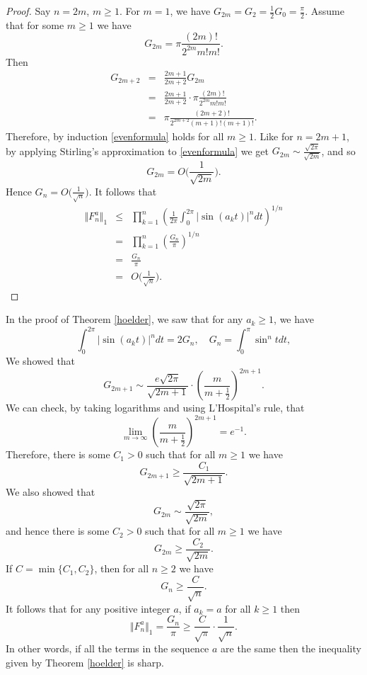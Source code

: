 \documentclass{article}
\newcommand{\norm}[1]{\Vert #1 \Vert}
\begin{document}
\begin{proof}
Say $n=2m$, $m \geq 1$. For $m=1$, we have $G_{2m}=G_2=\frac{1}{2}G_0=\frac{\pi}{2}$. 
Assume that for some $m \geq 1$ we have
\begin{equation}
G_{2m}=\pi \frac{(2m)!}{2^{2m}m!m!}.
\label{evenformula}
\end{equation}
Then
\begin{eqnarray*}
G_{2m+2}&=&\frac{2m+1}{2m+2}G_{2m}\\
&=&\frac{2m+1}{2m+2}\cdot \pi \frac{(2m)!}{2^{2m}m!m!}\\
&=&\pi \frac{(2m+2)!}{2^{2m+2}(m+1)!(m+1)!}.
\end{eqnarray*}
Therefore, by induction \eqref{evenformula} holds for all $m \geq 1$.
Like for $n=2m+1$, by applying Stirling's approximation to \eqref{evenformula} we get
$G_{2m} \sim \frac{\sqrt{2\pi}}{\sqrt{2m}}$, and so
\[
G_{2m}=O\Big(\frac{1}{\sqrt{2m}}\Big).
\]
Hence $G_n = O\Big(\frac{1}{\sqrt{n}}\Big)$.
It follows that
\begin{eqnarray*}
\norm{F_n^a}_1 &\leq& \prod_{k=1}^n \left(\frac{1}{2\pi}\int_0^{2\pi} |\sin (a_kt)|^n dt \right)^{1/n}\\
&=&\prod_{k=1}^n \left( \frac{G_n}{\pi} \right)^{1/n}\\
&=&\frac{G_n}{\pi}\\
&=&O\Big(\frac{1}{\sqrt{n}}\Big).
\end{eqnarray*}
\end{proof}

In the proof of Theorem \ref{hoelder}, we saw that for any $a_k \geq 1$, we have
\[
\int_0^{2\pi} |\sin(a_k t)|^n dt=2G_n, \quad G_n=\int_0^\pi \sin^n t dt,
\]
We showed that 
\[
G_{2m+1} \sim \frac{e\sqrt{2\pi}}{\sqrt{2m+1}} \cdot \left(\frac{m}{m+\frac{1}{2}} \right)^{2m+1}.
\]
We can check, by taking logarithms and using L'Hospital's rule, that
\[
\lim_{m \to \infty} \left(\frac{m}{m+\frac{1}{2}} \right)^{2m+1} = e^{-1}.
\]
Therefore, there is some $C_1>0$ such that for all $m \geq 1$ we have
\[
G_{2m+1} \geq \frac{C_1}{\sqrt{2m+1}}.
\]
We also showed that
\[
G_{2m} \sim \frac{\sqrt{2\pi}}{\sqrt{2m}},
\]
and hence there is some $C_2 >0$ such that for all $m \geq 1$ we have
\[
G_{2m} \geq \frac{C_2}{\sqrt{2m}}.
\]
If $C=\min\{C_1,C_2\}$, then for all $n \geq 2$ we have
\[
G_n \geq \frac{C}{\sqrt{n}}.
\]
It follows that for any positive integer $a$, if $a_k = a$ for all $k \geq 1$ then
\[
\norm{F_n^a}_1 = \frac{G_n}{\pi} \geq \frac{C}{\sqrt{\pi}}\cdot \frac{1}{\sqrt{n}}.
\]
In other words, if all the terms in the sequence $a$ are the same then the inequality given by Theorem \ref{hoelder} is sharp.
\end{document}
